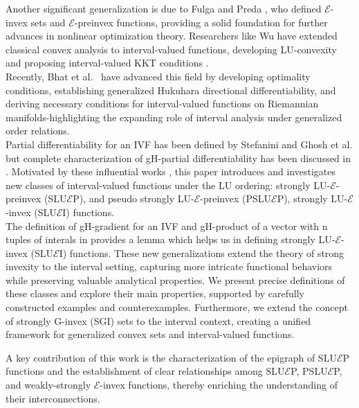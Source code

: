\documentclass[12pt, reqno]{amsart}
\theoremstyle{definition}
\theoremstyle{remark}
\numberwithin{equation}{section}
\begin{document}
 Another significant generalization is due to Fulga and Preda \cite{Fulga}, who defined $\mathcal{E}$-invex sets and $\mathcal{E}$-preinvex functions, providing a solid foundation for further advances in nonlinear optimization theory. Researchers like Wu have extended classical convex analysis to interval-valued functions, developing LU-convexity and proposing interval-valued KKT conditions \cite{Wu2007, Wu2009}.\\
Recently, Bhat et al.\ \cite{Bhat2024,Bhat2025a,Bhat2025b} have advanced this field by developing optimality conditions, establishing generalized Hukuhara directional differentiability, and deriving necessary conditions for interval-valued functions on Riemannian manifolds-highlighting the expanding role of interval analysis under generalized order relations.\\
Partial differentiability  for an IVF has been defined by Stefanini \cite{Stefanini2019} and Ghosh et al. \cite{Ghosh,Ghosh2019} but complete characterization of gH-partial differentiability has been discussed in \cite{Tauheed}.
Motivated by these influential works \cite{Bazaara,Lupsa,Pini,Suneja}, this paper introduces and investigates new classes of interval-valued functions under the LU ordering: strongly LU-$\mathcal{E}$-preinvex (SLU$\mathcal{E}$P), and pseudo strongly LU-$\mathcal{E}$-preinvex (PSLU$\mathcal{E}$P), strongly LU-$\mathcal{E}$-invex (SLU$\mathcal{E}$I) functions.\\
The definition of gH-gradient for an IVF and gH-product of a vector with n tuples of interals  in \cite{Tauheed} provides a lemma which helps us in defining strongly LU-$\mathcal{E}$-invex (SLU$\mathcal{E}$I) functions. These new generalizations extend the theory of strong invexity to the interval setting, capturing more intricate functional behaviors while preserving valuable analytical properties.
We present precise definitions of these classes and explore their main properties, supported by carefully constructed examples and counterexamples. Furthermore, we extend the concept of strongly G-invex (SGI) sets to the interval context, creating a unified framework for generalized convex sets and interval-valued functions.

A key contribution of this work is the characterization of the epigraph of SLU$\mathcal{E}$P functions and the establishment of clear relationships among SLU$\mathcal{E}$P, PSLU$\mathcal{E}$P, and weakly-strongly $\mathcal{E}$-invex functions, thereby enriching the understanding of their interconnections.
\end{document}
